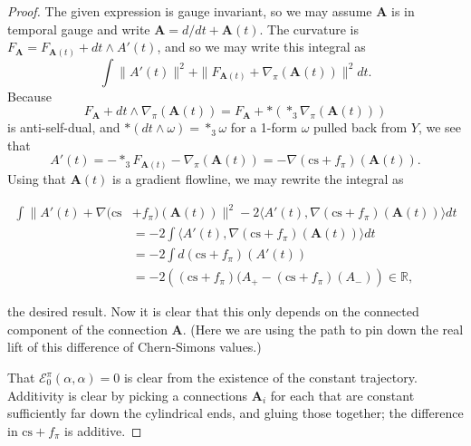 \documentclass[10pt,a4paper]{amsart}
\theoremstyle{definition}
\theoremstyle{remark}
\numberwithin{figure}{qchap}
\begin{document}
\begin{proof}The given expression is gauge invariant, so we may assume $\mathbf{A}$ is in temporal gauge and write $\mathbf{A} = d/dt + \mathbf{A}(t)$. The curvature is $F_{\mathbf{A}} = F_{\mathbf{A}(t)} + dt \wedge A'(t)$, and so we may write this integral as 
$$\int \|A'(t)\|^2 + \|F_{\mathbf{A}(t)} + \nabla_\pi\left(\mathbf{A}(t)\right)\|^2 dt.$$ 
Because 
$$F_{\mathbf{A}} + dt \wedge \nabla_\pi(\mathbf{A}(t)) = F_{\mathbf{A}} + *(*_3 \nabla_\pi(\mathbf{A}(t)))$$ 
is anti-self-dual, and $*(dt \wedge \omega) = *_3 \omega$ for a 1-form $\omega$ pulled back from $Y$, we see that 
$$A'(t) = - *_3 F_{\mathbf{A}(t)} - \nabla_\pi(\mathbf{A}(t)) = - \nabla(\text{cs} + f_\pi)(\mathbf{A}(t)).$$ 
Using that $\mathbf{A}(t)$ is a gradient flowline, we may rewrite the integral as 

\begin{align*}\int \|A'(t) + \nabla(\text{cs}&+f_\pi)(\mathbf{A}(t))\|^2 - 2\langle A'(t), \nabla(\text{cs}+f_\pi)(\mathbf{A}(t))\rangle dt \\
&= -2 \int \langle A'(t), \nabla(\text{cs}+f_\pi)(\mathbf{A}(t)) \rangle dt \\
&= -2 \int d(\text{cs}+f_{\pi})(A'(t))\\
&= -2\left((\text{cs}+f_\pi)(A_+ - (\text{cs}+f_\pi)(A_-)\right) \in \mathbb R,\end{align*}

the desired result. Now it is clear that this only depends on the connected component of the connection $\mathbf{A}$. (Here we are using the path to pin down the real lift of this difference of Chern-Simons values.) 

That $\mathcal E^\pi_0(\alpha, \alpha) = 0$ is clear from the existence of the constant trajectory. Additivity is clear by picking a connections $\mathbf{A}_i$ for each that are constant sufficiently far down the cylindrical ends, and gluing those together; the difference in $\text{cs}+f_\pi$ is additive.


\end{proof}
\end{document}
